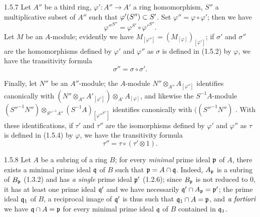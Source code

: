 \documentclass[../main.tex]{subfiles}
\begin{document}
\begin{cx}{1.5.7}
Let $A''$ be a third ring, $\varphi':A''\to A'$ a ring homomorphism,
$S''$ a multiplicative subset of $A''$ such that $\varphi'(S'')\subset S'$. Set
$\varphi''=\varphi\circ\varphi'$; then we have
\[
  {\varphi''}^{S''}=\varphi^{S'}\circ{\varphi'}^{S''}.
\]
Let $M$ be an $A$-module; evidently we have $M_{[\varphi'']}=(M_{[\varphi]})_{[\varphi']}$;
if $\sigma'$ and $\sigma''$ are the homomorphisms defined by $\varphi'$ and $\varphi''$ as
$\sigma$ is defined in (1.5.2) by $\varphi$, we have the transitivity formula
\[
  \sigma''=\sigma\circ\sigma'.
\]

Finally, let $N''$ be an $A''$-module; the $A$-module $N''\otimes_{A''}A_{[\varphi'']}$
identifies canonically with
$(N''\otimes_{A''}{A'}_{[\varphi']})\otimes_{A'}A_{[\varphi]}$,
and likewise the $S^{-1}A$-module
${({S''}^{-1}N'')\otimes_{{S''}^{-1}A''}(S^{-1}A)_{[{\varphi''}^{S''}]}}$ identifies
canonically with
$(({S''}^{-1}N'')$ . With these identifications, if $\tau'$
and $\tau''$ are the isomorphisms defined by $\varphi'$ and $\varphi''$ as $\tau$ is defined
in (1.5.4) by $\varphi$, we have the transitivity formula
\[
  \tau''=\tau\circ(\tau'\otimes 1).
\]
\end{cx}

\begin{cx}{1.5.8}
Let $A$ be a subring of a ring $B$; for every \emph{minimal} prime ideal $\mathfrak{p}$ of $A$, there
exists a minimal prime ideal $\mathfrak{q}$ of $B$ such that $\mathfrak{p}=A\cap\mathfrak{q}$. Indeed, $A_\mathfrak{p}$
is a subring of $B_\mathfrak{p}$ (1.3.2) and has \emph{a single} prime ideal $\mathfrak{p}'$ (1.2.6); since
$B_\mathfrak{p}$ is not reduced to $0$, it has at least one prime ideal $\mathfrak{q}'$ and we have
necessarily $\mathfrak{q}'\cap A_\mathfrak{p}=\mathfrak{p}'$; the prime ideal $\mathfrak{q}_1$ of $B$, a reciprocal image
of $\mathfrak{q}'$ is thus such that $\mathfrak{q}_1\cap A=\mathfrak{p}$, and $\emph{a fortiori}$ we have
$\mathfrak{q}\cap A=\mathfrak{p}$ for every minimal prime ideal $\mathfrak{q}$ of $B$ contained in $\mathfrak{q}_1$.
\end{cx}
\end{document}
